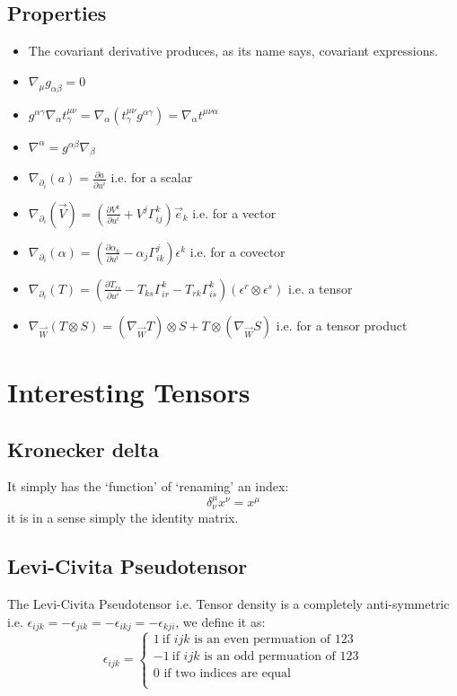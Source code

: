 \subsection{Properties}
\begin{itemize}
\item The covariant derivative produces, as its name says, covariant expressions.
\item $\nabla_{\mu} g_{\alpha \beta} = 0$
\item $g^{\alpha \gamma} \nabla_{\alpha}t^{\mu \nu}_{\gamma} = \nabla_{\alpha}(t^{\mu \nu}_{\gamma}g^{\alpha \gamma}) = \nabla_{\alpha}t^{\mu \nu \alpha}$
\item $\nabla^{\alpha} = g^{\alpha \beta}\nabla_{\beta}$
\item $\nabla_{\partial_{i}}(a) = \frac{\partial a}{\partial u^{i}}$ i.e. for a scalar
\item $\nabla_{\partial_{i}}(\vec{V}) = \left(\frac{\partial V^{k}}{\partial u^{i}} + V^{j} \Gamma^{k}_{ij}\right) \vec{e}_{k}$ i.e. for a vector
\item $\nabla_{\partial_{i}}(\alpha) = \left(\frac{\partial \alpha_{k}}{\partial u^{i}} - \alpha_{j} \Gamma^{j}_{ik}\right) \epsilon^{k}$ i.e. for a covector
\item $\nabla_{\partial_{i}}(T) = \left(\frac{\partial T_{rs}}{\partial u^{i}} - T_{ks} \Gamma^{k}_{ir} - T_{rk} \Gamma^{k}_{is}\right) (\epsilon^{r} \otimes \epsilon^{s})$ i.e. a tensor
\item $\nabla_{\vec{W}}(T \otimes S) = (\nabla_{\vec{W}}T) \otimes S + T \otimes (\nabla_{\vec{W}}S)$ i.e. for a tensor product
\end{itemize}
\section{Interesting Tensors}
\subsection{Kronecker delta}
It simply has the ‘function’ of ‘renaming’ an index:
$$\delta^{\mu}_{\nu} x^{\nu} = x^{\mu}$$
it is in a sense simply the identity matrix.
\subsection{Levi-Civita Pseudotensor}
\label{Levi}
The Levi-Civita Pseudotensor i.e. Tensor density is a completely anti-symmetric i.e. $\epsilon_{ijk} = -\epsilon_{jik} = -\epsilon_{ikj} = -\epsilon_{kji}$, we define it as:
\begin{equation}
\epsilon_{ijk} = \begin{cases}
1 \ \text{if } ijk \text{ is an even permuation of } 123\\
-1 \ \text{if } ijk \text{ is an odd permuation of } 123\\
0  \text{ if two indices are equal}\\
\end{cases}
\end{equation}
